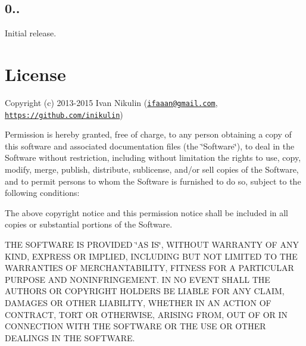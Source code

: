 \subsection*{0..}


\begin{DoxyItemize}
\item Initial release.
\end{DoxyItemize}

\section*{License}

Copyright (c) 2013-\/2015 Ivan Nikulin (\href{mailto:ifaaan@gmail.com}{\tt ifaaan@gmail.\+com}, \href{https://github.com/inikulin}{\tt https\+://github.\+com/inikulin})

Permission is hereby granted, free of charge, to any person obtaining a copy of this software and associated documentation files (the \char`\"{}\+Software\char`\"{}), to deal in the Software without restriction, including without limitation the rights to use, copy, modify, merge, publish, distribute, sublicense, and/or sell copies of the Software, and to permit persons to whom the Software is furnished to do so, subject to the following conditions\+:

The above copyright notice and this permission notice shall be included in all copies or substantial portions of the Software.

T\+HE S\+O\+F\+T\+W\+A\+RE IS P\+R\+O\+V\+I\+D\+ED \char`\"{}\+A\+S I\+S\char`\"{}, W\+I\+T\+H\+O\+UT W\+A\+R\+R\+A\+N\+TY OF A\+NY K\+I\+ND, E\+X\+P\+R\+E\+SS OR I\+M\+P\+L\+I\+ED, I\+N\+C\+L\+U\+D\+I\+NG B\+UT N\+OT L\+I\+M\+I\+T\+ED TO T\+HE W\+A\+R\+R\+A\+N\+T\+I\+ES OF M\+E\+R\+C\+H\+A\+N\+T\+A\+B\+I\+L\+I\+TY, F\+I\+T\+N\+E\+SS F\+OR A P\+A\+R\+T\+I\+C\+U\+L\+AR P\+U\+R\+P\+O\+SE A\+ND N\+O\+N\+I\+N\+F\+R\+I\+N\+G\+E\+M\+E\+NT. IN NO E\+V\+E\+NT S\+H\+A\+LL T\+HE A\+U\+T\+H\+O\+RS OR C\+O\+P\+Y\+R\+I\+G\+HT H\+O\+L\+D\+E\+RS BE L\+I\+A\+B\+LE F\+OR A\+NY C\+L\+A\+IM, D\+A\+M\+A\+G\+ES OR O\+T\+H\+ER L\+I\+A\+B\+I\+L\+I\+TY, W\+H\+E\+T\+H\+ER IN AN A\+C\+T\+I\+ON OF C\+O\+N\+T\+R\+A\+CT, T\+O\+RT OR O\+T\+H\+E\+R\+W\+I\+SE, A\+R\+I\+S\+I\+NG F\+R\+OM, O\+UT OF OR IN C\+O\+N\+N\+E\+C\+T\+I\+ON W\+I\+TH T\+HE S\+O\+F\+T\+W\+A\+RE OR T\+HE U\+SE OR O\+T\+H\+ER D\+E\+A\+L\+I\+N\+GS IN T\+HE S\+O\+F\+T\+W\+A\+RE. 